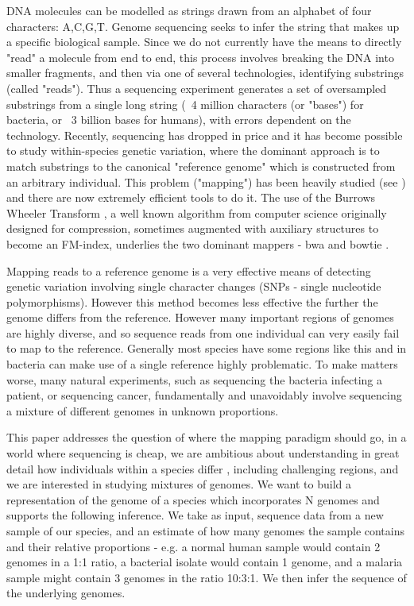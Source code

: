 \documentclass[runningheads,a4paper]{llncs}
\begin{document}
DNA molecules can be modelled as strings drawn from an alphabet of four characters: A,C,G,T. Genome sequencing seeks to infer the string that makes up a specific biological sample. Since we do not currently have the means to directly "read"  a molecule from end to end, this process involves breaking the DNA into smaller fragments, and then via one of several technologies, identifying substrings (called "reads"). Thus a sequencing experiment generates a set of oversampled substrings from a single long string (~4 million characters (or "bases") for bacteria, or ~3 billion bases for humans), with errors dependent on the technology. Recently, sequencing has dropped in price and it has become possible to study within-species genetic variation, where the dominant approach is to match substrings to the canonical "reference genome" which is constructed from an arbitrary individual.  This problem ("mapping") has been heavily studied  (see \cite{reinert}) and there are now extremely efficient tools to do it. The use of the Burrows Wheeler Transform \cite{bwt}, a well known algorithm from computer science originally designed for compression, sometimes augmented with auxiliary structures to become an FM-index, underlies the two dominant mappers - bwa \cite{bwa}and bowtie \cite{bowtie}.

Mapping reads to a reference genome is a very effective means of detecting genetic variation involving single character changes (SNPs - single nucleotide polymorphisms). However this method becomes less effective the further the genome differs from the reference. However many important regions of genomes are highly diverse, and so sequence reads from one individual can very easily fail to map to the reference. Generally most species have some regions like this and in bacteria can make use of a single reference highly problematic. To make matters worse, many natural experiments, such as sequencing the bacteria infecting a patient,  or sequencing cancer,  fundamentally and unavoidably involve sequencing a mixture of different genomes in unknown proportions. 

This paper addresses the question of where the mapping paradigm should go, in a world where sequencing is cheap,  we are ambitious about understanding in great detail how individuals within a species differ \cite{1000g,arabi,pombe}, including challenging regions, and we are interested in studying mixtures of genomes.  We want to build a representation of the genome of a species which incorporates N genomes and supports the following inference. We take as input, sequence data from a new sample of our species, and  an estimate of how many genomes the sample contains and their relative proportions - e.g. a normal human sample would contain 2 genomes in a 1:1 ratio, a bacterial isolate would contain 1 genome, and a malaria sample might contain 3 genomes in the ratio 10:3:1. We then infer the sequence of the underlying genomes. 
\end{document}
